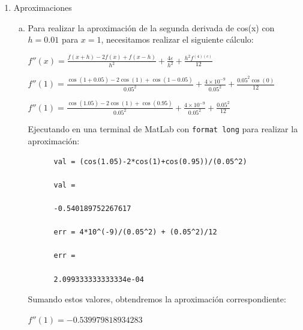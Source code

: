 \documentclass[english,notitlepage,letterpaper, 10pt]{article} %
\begin{document}
\begin{enumerate}
  \item Aproximaciones

  \begin{enumerate}[a)] 
    \item Para realizar la aproximación de la segunda derivada de cos(x) con $h=0.01$ para $x=1$, necesitamos realizar el siguiente cálculo:  
    
    
    \begin{center}  
      \begin{math}  
        f''(x) = \displaystyle \frac{f(x+h)-2f(x)+f(x-h)}{h^2} + \frac{4\varepsilon}{h^2} + \frac{h^2 f^{(4)(c)}}{12}
      \end{math}  
      
      \begin{math}  
        f''(1) = \displaystyle \frac{\cos(1+0.05)-2\cos(1)+\cos(1-0.05)}{0.05^2}  + \frac{4\times 10^{-9}}{0.05^2} + \frac{0.05^2 \cos(0)}{12}
      \end{math}  
      
      \begin{math}  
        f''(1) = \displaystyle \frac{\cos(1.05)-2\cos(1)+\cos(0.95)}{0.05^2}  + \frac{4\times 10^{-9}}{0.05^2} + \frac{0.05^2}{12}
      \end{math}  
    \end{center}  
    
    Ejecutando en una terminal de MatLab con \texttt{format long} para realizar la aproximación:  
    
    \begin{lstlisting}  
      val = (cos(1.05)-2*cos(1)+cos(0.95))/(0.05^2) 
      
      val =       
      
      -0.540189752267617  

      err = 4*10^(-9)/(0.05^2) + (0.05^2)/12

      err = 
      
      2.099333333333334e-04
    \end{lstlisting}  
    
    Sumando estos valores, obtendremos la aproximación correspondiente:

    \begin{center}  
      \begin{math}  
        f''(1) = -0.539979818934283
      \end{math}  
    \end{center}  



\end{enumerate}
\end{enumerate}
\end{document}
